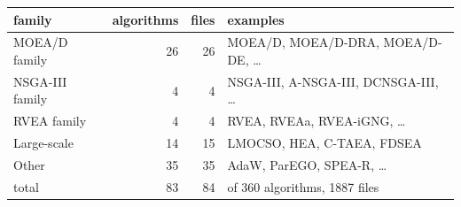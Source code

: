 \small
\begin{tabular}{lrrl}
\toprule
family & algorithms & files & examples \\
\midrule
MOEA/D family & 26 & 26 & MOEA/D, MOEA/D-DRA, MOEA/D-DE, \dots \\
NSGA-III family & 4 & 4 & NSGA-III, A-NSGA-III, DCNSGA-III, \dots \\
RVEA family & 4 & 4 & RVEA, RVEAa, RVEA-iGNG, \dots \\
Large-scale & 14 & 15 & LMOCSO, HEA, C-TAEA, FDSEA \\
Other & 35 & 35 & AdaW, ParEGO, SPEA-R, \dots \\
\midrule
total & 83 & 84 & of 360 algorithms, 1887 files \\
\bottomrule
\end{tabular}
